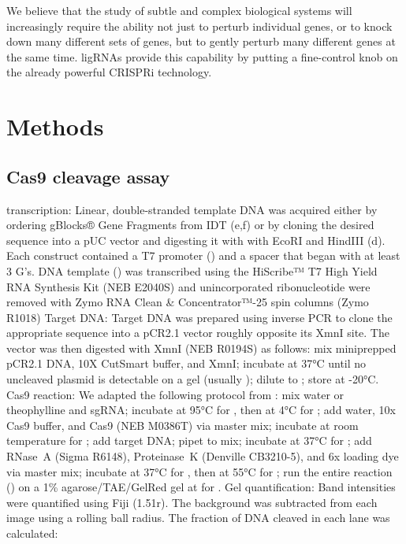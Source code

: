 \documentclass[10pt,oneside]{article}
\begin{document}
We believe that the study of subtle and complex biological systems will increasingly require the ability not just to perturb individual genes, or to knock down many different sets of genes, but to gently perturb many different genes at the same time.  ligRNAs provide this capability by putting a fine-control knob on the already powerful CRISPRi technology.

\section{Methods}
% 
% 
\subsection{\Invitro{} Cas9 cleavage assay}

\Invitro{} transcription: Linear, double-stranded template DNA was acquired either by ordering gBlocks® Gene Fragments from IDT (e,f) or by cloning the desired sequence into a pUC vector and digesting it with with EcoRI and HindIII (d).  Each construct contained a T7 promoter () and a spacer that began with at least 3 G's.  DNA template () was transcribed using the HiScribe™ T7 High Yield RNA Synthesis Kit (NEB E2040S) and unincorporated ribonucleotide were removed with Zymo RNA Clean \& Con\-cen\-trator™-25 spin columns (Zymo R1018) Target DNA: Target DNA was prepared using inverse PCR to clone the appropriate sequence into a pCR2.1 vector roughly opposite its XmnI site.  The vector was then digested with XmnI (NEB R0194S) as follows: mix   miniprepped pCR2.1 DNA,  10X CutSmart buffer, and   XmnI; incubate at 37°C until no uncleaved plasmid is detectable on a gel (usually ); dilute to ; store at -20°C.  Cas9 reaction: We adapted the following protocol from : mix  water or  theophylline and   sgRNA; incubate at 95°C for , then at 4°C for ; add  water,  10x Cas9 buffer, and   Cas9 (NEB M0386T) via master mix; incubate at room temperature for ; add   target DNA; pipet to mix; incubate at 37°C for ; add   RNase~A (Sigma R6148),   Proteinase~K (Denville CB3210-5), and  6x loading dye via master mix; incubate at 37°C for , then at 55°C for ; run the entire reaction () on a 1\% agarose/TAE/GelRed gel at  for .  Gel quantification: Band intensities were quantified using Fiji (1.51r).  The background was subtracted from each image using a  rolling ball radius.  The fraction of DNA cleaved in each lane was calculated:
\end{document}
